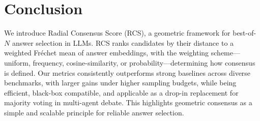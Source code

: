 \section{Conclusion}


We introduce Radial Consensus Score (RCS), a geometric framework for best-of-$N$ answer selection in LLMs. 
RCS ranks candidates by their distance to a weighted Fréchet mean of answer embeddings, with the weighting scheme---uniform, frequency, cosine-similarity, or probability---determining how consensus is defined. 
Our metrics consistently outperforms strong baselines across diverse benchmarks, with larger gains under higher sampling budgets, while being efficient, black-box compatible, and applicable as a drop-in replacement for majority voting in multi-agent debate. 
This highlights geometric consensus as a simple and scalable principle for reliable answer selection.


